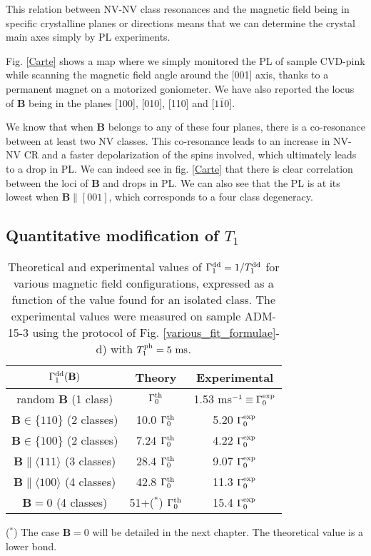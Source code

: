 \documentclass[a4paper,11pt]{report}
\begin{document}
This relation between NV-NV class resonances and the magnetic field being in specific crystalline planes or directions means that we can determine the crystal main axes simply by PL experiments.

Fig. \ref{Carte} shows a map where we simply monitored the PL of sample CVD-pink while scanning the magnetic field angle around the [001] axis, thanks to a permanent magnet on a motorized goniometer. We have also reported the locus of $\mathbf{B}$ being in the planes [100], [010], [110] and [$1\bar 1 0$].

We know that when $\mathbf{B}$ belongs to any of these four planes, there is a co-resonance between at least two NV classes. This co-resonance leads to an increase in NV-NV CR and a faster depolarization of the spins involved, which ultimately leads to a drop in PL. We can indeed see in fig. \ref{Carte} that there is clear correlation between the loci of $\mathbf{B}$ and drops in PL. We can also see that the PL is at its lowest when $\mathbf{B}\parallel [001]$, which corresponds to a four class degeneracy.

\subsection{Quantitative modification of $T_1$}
\label{sec quantitative T1}
\begin{table}[htbp]
\centering
\caption{Theoretical and experimental values of $\Gamma_1^{\rm dd}=1/T_1^{\rm dd}$ for various magnetic field configurations, expressed as a function of the value found for an isolated class. The experimental values were measured on sample ADM-15-3 using the protocol of Fig. \ref{various_fit_formulae}-d) with $T_1^{\rm ph}= 5\ \rm ms$.}
 \label{T1 champ mag}
\begin{tabular}{c|cc}
\toprule
$\Gamma_1^{\rm dd} (\mathbf{B})$ &  Theory & Experimental \\
\midrule
random $\mathbf{B}$ (1 class) & $\Gamma_0^{\rm th}$ & 1.53 ms$^{-1} \equiv \Gamma_0^{\rm exp}$ \\
$\mathbf{B} \in \{110\}$ (2 classes) & 10.0 $\Gamma_0^{\rm th}$ & 5.20 $\Gamma_0^{\rm exp}$ \\
$\mathbf{B} \in \{100\}$ (2 classes) & 7.24 $\Gamma_0^{\rm th}$ & 4.22 $\Gamma_0^{\rm exp}$ \\
$\mathbf{B} \parallel \langle 111 \rangle$ (3 classes) & 28.4 $\Gamma_0^{\rm th}$ & 9.07 $\Gamma_0^{\rm exp}$ \\
$\mathbf{B} \parallel \langle 100 \rangle$ (4 classes) & 42.8 $\Gamma_0^{\rm th}$ & 11.3 $\Gamma_0^{\rm exp}$ \\
$\mathbf{B}=0$ (4 classes) & 51+($^*$) $\Gamma_0^{\rm th}$ & 15.4 $\Gamma_0^{\rm exp}$ \\
\bottomrule
\end{tabular}

($^*$) The case $\mathbf{B}=0$ will be detailed in the next chapter. The theoretical value is a lower bond.
\end{table}
\end{document}

